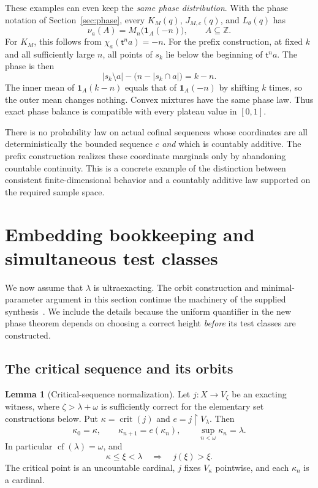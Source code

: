 \documentclass[11pt,letterpaper]{article}
\theoremstyle{definition}
\newtheorem{lemma}[definition]{Lemma}
\newcommand{\crit}{\operatorname{crit}}
\newcommand{\cf}{\operatorname{cf}}
\newcommand{\restr}{\mathbin{\upharpoonright}}
\newcommand{\ind}{\mathbf 1}
\newcommand{\tail}{\mathsf t}
\begin{document}
These examples can even keep the \emph{same phase distribution}. With the phase notation of Section~\ref{sec:phase}, every $K_M(q)$, $J_{M,c}(q)$, and $L_\theta(q)$ has
\[
 \nu_a(A)=M_n\bigl(\ind_A(-n)\bigr),\qquad A\subseteq\mathbb Z.
\]
For $K_M$, this follows from $\chi_a(\tail^n a)=-n$. For the prefix construction, at fixed $k$ and all sufficiently large $n$, all points of $s_k$ lie below the beginning of $\tail^n a$. The phase is then
\[
 |s_k\setminus a|-\bigl(n-|s_k\cap a|\bigr)=k-n.
\]
The inner mean of $\ind_A(k-n)$ equals that of $\ind_A(-n)$ by shifting $k$ times, so the outer mean changes nothing. Convex mixtures have the same phase law. Thus exact phase balance is compatible with every plateau value in $[0,1]$.

There is no probability law on actual cofinal sequences whose coordinates are all deterministically the bounded sequence $c$ \emph{and} which is countably additive. The prefix construction realizes these coordinate marginals only by abandoning countable continuity. This is a concrete example of the distinction between consistent finite-dimensional behavior and a countably additive law supported on the required sample space.

\section{Embedding bookkeeping and simultaneous test classes}\label{sec:embed}

We now assume that $\lambda$ is ultraexacting. The orbit construction and minimal-parameter argument in this section continue the machinery of the supplied synthesis~\cite[Sections 8 and 12]{archive}. We include the details because the uniform quantifier in the new phase theorem depends on choosing a correct height \emph{before} its test classes are constructed.

\subsection{The critical sequence and its orbits}

\begin{lemma}[Critical-sequence normalization]\label{lem:normalization}
Let $j:X\to V_\zeta$ be an exacting witness, where $\zeta>\lambda+\omega$ is sufficiently correct for the elementary set constructions below. Put $\kappa=\crit(j)$ and $e=j\restr V_\lambda$. Then
\[
 \kappa_0=\kappa,\qquad \kappa_{n+1}=e(\kappa_n),
 \qquad \sup_{n<\omega}\kappa_n=\lambda.
\]
In particular $\cf(\lambda)=\omega$, and
\begin{equation}\label{eq:moved}
 \kappa\le\xi<\lambda\quad\Longrightarrow\quad j(\xi)>\xi.
\end{equation}
The critical point is an uncountable cardinal, $j$ fixes $V_\kappa$ pointwise, and each $\kappa_n$ is a cardinal.
\end{lemma}
\end{document}

